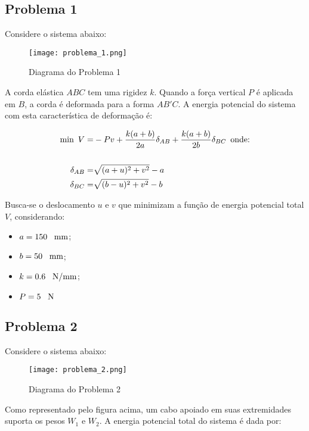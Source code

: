\documentclass{article}
\begin{document}
\subsection{Problema 1}
Considere o sistema abaixo:

\begin{figure}[H]
  \centering
  \texttt{[image: problema\_1.png]}
  \caption{Diagrama do Problema 1}
\end{figure}

A corda elástica $A BC$ tem uma rigidez $k$. Quando a força vertical $P$ é aplicada em $B$, a corda é deformada para a forma $A B'C$. A energia potencial do sistema com esta característica de deformação é:

\begin{equation}
\begin{split}
\text{min}\text{\phantom{0}}V = & -Pv + \frac{k(a+b)}{2a} \delta_{AB} + \frac{k(a+b)}{2b} \delta_{BC} \phantom{0} \text{onde:} \\
\phantom{0} & \phantom{0} \\
\delta_{AB} = & \sqrt{(a+u)^2 + v^2} - a  \\
\delta_{BC} = & \sqrt{(b-u)^2 + v^2} - b  \\
\end{split}
\end{equation}

Busca-se o deslocamento $u$ e $v$ que minimizam a função de energia potencial total $V$, considerando:

\begin{itemize}
\item $a = 150\text{\phantom{0} mm}$;
\item $b = 50\text{\phantom{0} mm}$;
\item $k = 0.6\text{\phantom{0} N/mm}$;
\item $P = 5\text{\phantom{0} N}$
\end{itemize}

\subsection{Problema 2}
Considere o sistema abaixo:

\begin{figure}[H]
  \centering
  \texttt{[image: problema\_2.png]}
  \caption{Diagrama do Problema 2}
\end{figure}

Como representado pelo figura acima, um cabo apoiado em suas extremidades suporta os pesos $W_1$ e $W_2$. A energia potencial total do sistema é dada por:
\end{document}
